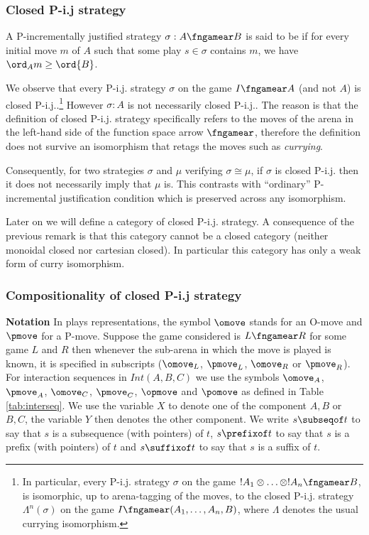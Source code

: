 \subsubsection{Closed P-i.j strategy}

\begin{definition}
\label{def:safe_strategy}
A P-incrementally justified strategy $\sigma : A \fngamear B$ is said to be  if for
every initial move $m$ of $A$ such that some play $s\in\sigma$ contains $m$, we have $\ord_A{m} \geq \ord{B}$.
\end{definition}
We observe that every P-i.j. strategy $\sigma$ on the game $I \fngamear A$ (and not $A$) is closed P-i.j..\footnote{In particular, every P-i.j. strategy $\sigma$ on the game $!A_1 \otimes \ldots \otimes !A_n \fngamear B$, is isomorphic, up to arena-tagging of the moves, to the closed P-i.j. strategy $\Lambda^n(\sigma)$ on the game $I \fngamear (A_1,\ldots,A_n,B)$, where $\Lambda$ denotes the usual currying isomorphism.}
However $\sigma : A$ is not necessarily closed P-i.j.. The reason is that the definition of closed P-i.j. strategy specifically refers to the moves of  the arena in the left-hand side of the function space arrow $\fngamear$, therefore the definition does not survive an isomorphism that retags the moves such as {\it currying}.

Consequently, for two strategies $\sigma$ and $\mu$ verifying $\sigma \cong \mu$, if $\sigma$ is closed P-i.j. then it does not necessarily imply that $\mu$ is. This contrasts with ``ordinary'' P-incremental justification condition which is preserved across any isomorphism.

Later on we will define a category of closed P-i.j. strategy. A consequence of the previous remark is that this category cannot be a closed category (neither monoidal closed nor cartesian closed).
In particular this category has only a weak form of curry isomorphism.

\subsubsection{Compositionality of closed P-i.j strategy}

{\bf Notation} In plays representations, the symbol $\omove$ stands
for an O-move and $\pmove$ for a P-move. Suppose the game considered
is $L\fngamear R$ for some game $L$ and $R$ then whenever the
sub-arena in which the move is played is known, it is specified in
subscripts ($\omove_L$, $\pmove_L$, $\omove_R$ or $\pmove_R$). For
interaction sequences in $Int(A,B,C)$ we use the symbols $\omove_A$,
$\pmove_A$, $\omove_C$, $\pmove_C$, $\opmove$ and $\pomove$ as
defined in Table \ref{tab:interseq}. We use the variable $X$ to
denote one of the component $A,B$ or $B,C$, the variable  $Y$ then
denotes the other component. We write $s \subseqof t$ to say that
$s$ is a subsequence (with pointers) of $t$, $s \prefixof t$ to say
that $s$ is a prefix (with pointers) of $t$ and  $s \suffixof t$ to
say that $s$ is a suffix of $t$.

